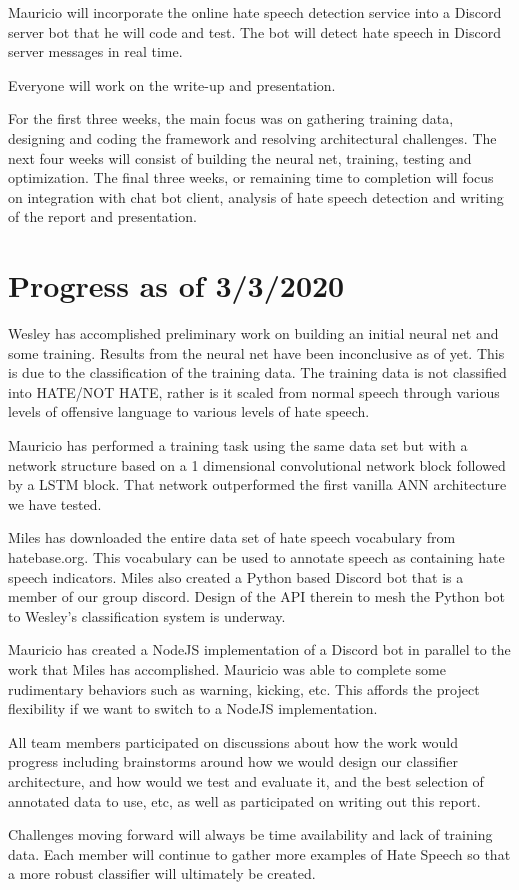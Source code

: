 \documentclass[conference]{sig-alternate-05-2015}
\begin{document}
Mauricio will incorporate the online hate speech detection service into a Discord server bot that he will code and test. The bot will detect hate speech in Discord server messages in real time.

Everyone will work on the write-up and presentation.

For the first three weeks, the main focus was on gathering training data, designing and coding the framework and resolving architectural challenges.  The next four weeks will consist of building the neural net, training, testing and optimization.  The final three weeks, or remaining time to completion will focus on integration with chat bot client, analysis of hate speech detection and writing of the report and presentation.

\section{Progress as of 3/3/2020}

Wesley has accomplished preliminary work on building an initial neural net and some training.  Results from the neural net have been inconclusive as of yet.  This is due to the classification of the training data.  The training data is not classified into HATE/NOT HATE, rather is it scaled from normal speech through various levels of offensive language to various levels of hate speech.

Mauricio has performed a training task using the same data set but with a network structure based on a 1 dimensional convolutional network block followed by a LSTM block. That network outperformed the first vanilla ANN architecture we have tested.

Miles has downloaded the entire data set of hate speech vocabulary from hatebase.org.  This vocabulary can be used to annotate speech as containing hate speech indicators.  Miles also created a Python based Discord bot that is a member of our group discord.  Design of the API therein to mesh the Python bot to Wesley's classification system is underway.

Mauricio has created a NodeJS implementation of a Discord bot in parallel to the work that Miles has accomplished.  Mauricio was able to complete some rudimentary behaviors such as warning, kicking, etc.  This affords the project flexibility if we want to switch to a NodeJS implementation.

All team members participated on discussions about how the work would progress including brainstorms around how we would design our classifier architecture, and how would we test and evaluate it,  and the best selection of annotated data to use, etc, as well as participated on writing out this report. 

Challenges moving forward will always be time availability and lack of training data.  Each member will continue to gather more examples of Hate Speech so that a more robust classifier will ultimately be created.  



\end{document}
